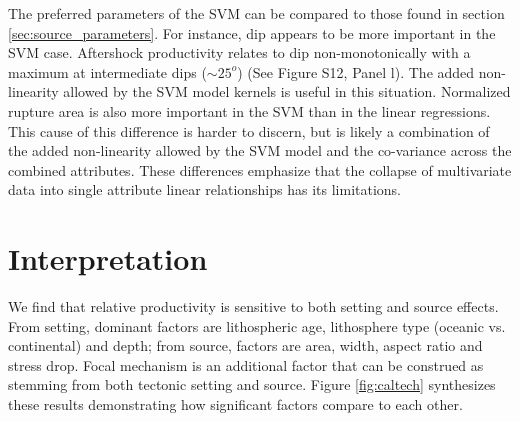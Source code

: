 \documentclass[draft, jgrga]{agujournal2018}
\begin{document}
The preferred parameters of the SVM can be compared to those found in section \ref{sec:source_parameters}. For instance, dip appears to be more important in the SVM case. Aftershock productivity relates to dip non-monotonically with a maximum at intermediate  dips ($\sim 25^o$) (See Figure S12, Panel l). The added non-linearity allowed by the SVM model kernels is useful in this situation. Normalized rupture area is also more important in the SVM than in the linear regressions. This cause of this difference is harder to discern, but is likely a combination of the added non-linearity allowed by the SVM model and the co-variance across the combined attributes. These differences emphasize that the collapse of multivariate data into single attribute linear relationships has its limitations.

   


\section{Interpretation}
    
We find that relative productivity is sensitive to both setting and source effects. From setting, dominant factors are lithospheric age, lithosphere type (oceanic vs. continental) and depth; from source, factors are area, width, aspect ratio and stress drop. Focal mechanism is an additional factor that can be construed as stemming from both tectonic setting and source. Figure \ref{fig:caltech} synthesizes these results demonstrating how significant factors compare to each other. 
\end{document}
